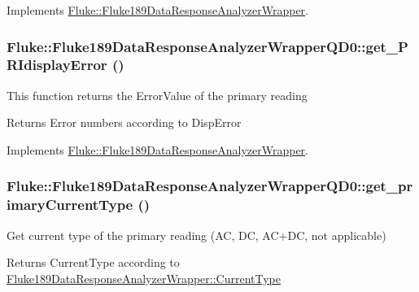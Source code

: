 Implements \hyperlink{classFluke_1_1Fluke189DataResponseAnalyzerWrapper_a18e1b686e50a4cc3a7023c646f66a35c}{Fluke::Fluke189DataResponseAnalyzerWrapper}.\hypertarget{classFluke_1_1Fluke189DataResponseAnalyzerWrapperQD0_a92b0a7a3c0cfd671f86df8e8b61aebb8}{
\subsubsection[{get\_\-PRIdisplayError}]{ Fluke::Fluke189DataResponseAnalyzerWrapperQD0::get\_\-PRIdisplayError ()}}
\label{classFluke_1_1Fluke189DataResponseAnalyzerWrapperQD0_a92b0a7a3c0cfd671f86df8e8b61aebb8}
This function returns the ErrorValue of the primary reading \begin{DoxyReturn}{Returns}
Error numbers according to DispError 
\end{DoxyReturn}


Implements \hyperlink{classFluke_1_1Fluke189DataResponseAnalyzerWrapper_ae6b5bf434d9600f4178650d66922a3aa}{Fluke::Fluke189DataResponseAnalyzerWrapper}.\hypertarget{classFluke_1_1Fluke189DataResponseAnalyzerWrapperQD0_acffb9af55e2d690060ef210977c3c933}{
\subsubsection[{get\_\-primaryCurrentType}]{ Fluke::Fluke189DataResponseAnalyzerWrapperQD0::get\_\-primaryCurrentType ()}}
\label{classFluke_1_1Fluke189DataResponseAnalyzerWrapperQD0_acffb9af55e2d690060ef210977c3c933}
Get current type of the primary reading (AC, DC, AC+DC, not applicable) \begin{DoxyReturn}{Returns}
CurrentType according to \hyperlink{classFluke_1_1Fluke189DataResponseAnalyzerWrapper_afef24496da239e3613c40ad3582d7adc}{Fluke189DataResponseAnalyzerWrapper::CurrentType} 
\end{DoxyReturn}


